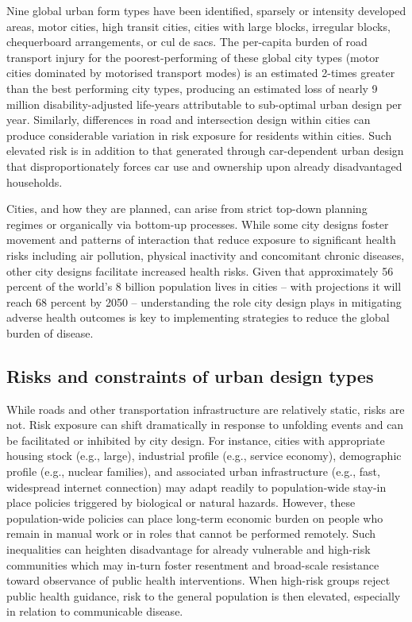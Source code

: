 \documentclass[preprint,10pt]{elsarticle} %
\begin{document}
Nine global urban form types have been identified\cite{Thompson2020}, sparsely or intensity developed areas, motor cities, high transit cities, cities with large blocks, irregular blocks, chequerboard arrangements, or cul de sacs. The per-capita burden of road transport injury for the poorest-performing of these global city types (motor cities dominated by motorised transport modes) is an estimated 2-times greater than the best performing city types, producing an estimated loss of nearly 9 million disability-adjusted life-years attributable to sub-optimal urban design per year\cite{Thompson2020}. Similarly, differences in road and intersection design within cities can produce considerable variation in risk exposure for residents within cities\cite{Wijnands_IntersectionDesign2021,MORRISON2019123}. Such elevated risk is in addition to that generated through car-dependent urban design that disproportionately forces car use and ownership upon already disadvantaged households\cite{currie2018alarming, CURL201861}. 

Cities, and how they are planned, can arise from strict top-down planning regimes\cite{mundigo1977city} or organically via bottom-up processes\cite{batty2017thinking}. While some city designs foster movement and patterns of interaction that reduce exposure to significant health risks including air pollution, physical inactivity and concomitant chronic diseases, other city designs facilitate increased health risks\cite{Wijnands2022, Stevenson2016,wang2023flood, stanley2022managing}. Given that approximately 56 percent of the world's 8 billion population lives in cities -- with projections it will reach 68 percent by 2050\cite{WHO2023}  -- understanding the role city design plays in mitigating adverse health outcomes is key to implementing strategies to reduce the global burden of disease. 

\subsection*{Risks and constraints of urban design types}
While roads and other transportation infrastructure are relatively static, risks are not. Risk exposure can shift dramatically in response to unfolding events and can be facilitated or inhibited by city design. For instance, cities with appropriate housing stock (e.g., large), industrial profile (e.g., service economy), demographic profile (e.g., nuclear families), and associated urban infrastructure (e.g., fast, widespread internet connection) may adapt readily to population-wide stay-in place policies triggered by biological or natural hazards\cite{hale2021global}. However, these population-wide policies can place long-term economic burden on people who remain in manual work or in roles that cannot be performed remotely\cite{CraigWFH,Vyas2021}. Such inequalities can heighten disadvantage for already vulnerable and high-risk communities\cite{martin2020fighting} which may in-turn foster resentment and broad-scale resistance toward observance of public health interventions\cite{de2016sustainability}. When high-risk groups reject public health guidance, risk to the general population is then elevated, especially in relation to communicable disease\cite{koopman2005control}.
\end{document}
